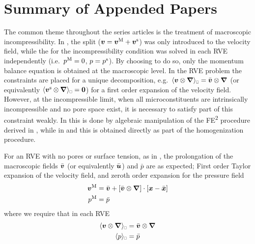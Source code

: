 \documentclass[MikaelDissertation.tex]{subfiles}
\begin{document}
\chapter{Summary of Appended Papers}

The common theme throughout the series articles is the treatment of macroscopic incompressibility.
In , the split ($\boldsymbol{v} = \boldsymbol{v}^{\mathrm{M}} + \boldsymbol{v}^{\mathrm{s}}$) was only introduced to the velocity field, while the for the incompressibility condition was solved in each RVE independently (i.e.\ $p^{\mathrm{M}} = 0$, $p = p^{\mathrm{s}}$).
By choosing to do so, only the momentum balance equation is obtained at the macroscopic level.
In the RVE problem the constraints are placed for a unique decomposition, e.g.\ $\homgen{\ta v \outerp\diff} = \bar{\ta v}\outerp\diff$ (or equivalently $\homgen{\ta v^\fluct\outerp\diff} = \ts 0$) for a first order expansion of the velocity field.
However, at the incompressible limit, when all microconstituents are intrinsically incompressible and no pore space exist, it is necessary to satisfy part of this constraint weakly.
In  this is done by algebraic manipulation of the FE\textsuperscript{2} procedure derived in , while in  and  this is obtained directly as part of the homogenization procedure.


For an RVE with no pores or surface tension, as in , the prolongation of the macroscopic fields $\bar{\boldsymbol{v}}$ (or equivalently $\bar{\boldsymbol{u}}$) and $\bar{p}$ are as expected;
First order Taylor expansion of the velocity field, and zeroth order expansion for the pressure field
\begin{align}
 \boldsymbol{v}^{\mathrm{M}} &= \bar{\boldsymbol{v}} + [\bar{\boldsymbol{v}}\mathbin{\otimes}\boldsymbol{\nabla}]\cdot[\boldsymbol{x} - \bar{\boldsymbol{x}}]
\\
 p^{\mathrm{M}} &= \bar{p}
\end{align}
where we require that in each RVE
\begin{align}
 \homgen{\ta v\outerp\diff} &= \bar{\ta v}\outerp\diff
\\
 \homgen{p} &= \bar{p}
\end{align}
\end{document}
